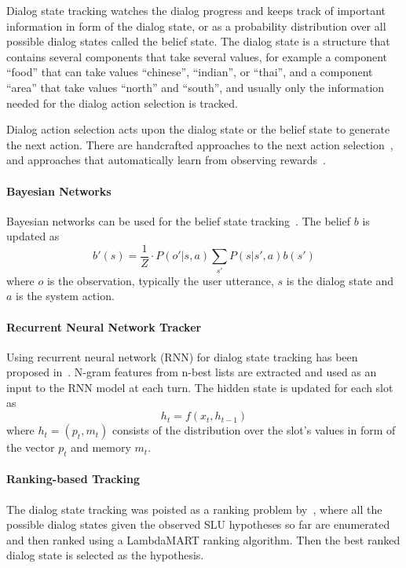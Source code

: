 \documentclass[10pt,twocolumn]{article}
\begin{document}
Dialog state tracking watches the dialog progress and keeps track of important information in form of the dialog state, or as a probability distribution over all possible dialog states called the belief state. The dialog state is a structure that contains several components that take several values, for example a component ``food'' that can take values ``chinese'', ``indian'', or ``thai'', and a component ``area'' that take values ``north'' and ``south'', and usually only the information needed for the dialog action selection is tracked.

Dialog action selection acts upon the dialog state or the belief state to generate the next action. There are handcrafted approaches to the next action selection~\cite{pieraccini2005we,skantze2008galatea}, and approaches that automatically learn from observing rewards~\cite{levin2000stochastic,walker2000application,lemon2006isu,thomson2010bayesian}.

\paragraph*{Bayesian Networks}
Bayesian networks can be used for the belief state tracking~\cite{pulman1996conversational,williams2007applying,bui2006tractable,thomson2010bayesian}. The belief $b$ is updated as
$$b'(s)=\frac{1}{Z} \cdot P(o'|s,a)\sum_{s'}P(s|s',a)b(s')$$
where $o$ is the observation, typically the user utterance, $s$ is the dialog state and $a$ is the system action.

\paragraph*{Recurrent Neural Network Tracker}
Using recurrent neural network (RNN) for dialog state tracking has been proposed in~\cite{henderson2014word,henderson2013deep}. N-gram features from n-best lists are extracted and used as an input to the RNN model at each turn. The hidden state is updated for each slot as
$$h_t=f(x_t, h_{t-1})$$
where $h_t=(p_t, m_t)$ consists of the distribution over the slot's values in form of the vector $p_t$ and memory $m_t$.

\paragraph*{Ranking-based Tracking}
The dialog state tracking was poisted as a ranking problem by~\cite{williams2014web}, where all the possible dialog states given the observed SLU hypotheses so far are enumerated and then ranked using a LambdaMART ranking algorithm. Then the best ranked dialog state is selected as the hypothesis.
\end{document}
